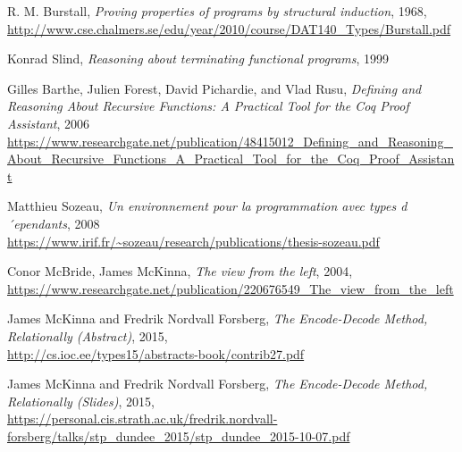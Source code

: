 \documentclass[declaration,mgr,english,shortabstract]{iithesis}
\begin{document}
\begin{thebibliography}{1}
    R. M. Burstall,
    \textit{Proving properties of programs by structural induction},
    1968, \\
    \url{http://www.cse.chalmers.se/edu/year/2010/course/DAT140_Types/Burstall.pdf}

    Konrad Slind,
    \textit{Reasoning about terminating functional programs},
    1999

    Gilles Barthe, Julien Forest, David Pichardie, and Vlad Rusu,
    \textit{Defining and Reasoning About Recursive
    Functions: A Practical Tool for the Coq
    Proof Assistant},
    2006 \\
    \url{https://www.researchgate.net/publication/48415012_Defining_and_Reasoning_About_Recursive_Functions_A_Practical_Tool_for_the_Coq_Proof_Assistant}

    Matthieu Sozeau,
    \textit{Un environnement pour la programmation avec types d´ependants},
    2008 \\
    \url{https://www.irif.fr/~sozeau/research/publications/thesis-sozeau.pdf}

    Conor McBride, James McKinna,
    \textit{The view from the left},
    2004, \\
    \url{https://www.researchgate.net/publication/220676549_The_view_from_the_left}

    James McKinna and Fredrik Nordvall Forsberg,
    \textit{The Encode-Decode Method, Relationally (Abstract)},
    2015, \\
    \url{http://cs.ioc.ee/types15/abstracts-book/contrib27.pdf}

    James McKinna and Fredrik Nordvall Forsberg,
    \textit{The Encode-Decode Method, Relationally (Slides)},
    2015, \\
    \url{https://personal.cis.strath.ac.uk/fredrik.nordvall-forsberg/talks/stp_dundee_2015/stp_dundee_2015-10-07.pdf}

\end{thebibliography}
\end{document}
